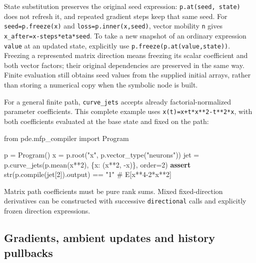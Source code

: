\documentclass[
  11pt,
]{article}
\newenvironment{Shaded}{\begin{snugshade}}{\end{snugshade}}
\newcommand{\BuiltInTok}[1]{\textcolor[rgb]{0.00,0.23,0.31}{#1}}
\newcommand{\CommentTok}[1]{\textcolor[rgb]{0.37,0.37,0.37}{#1}}
\newcommand{\ControlFlowTok}[1]{\textcolor[rgb]{0.00,0.23,0.31}{\textbf{#1}}}
\newcommand{\DecValTok}[1]{\textcolor[rgb]{0.68,0.00,0.00}{#1}}
\newcommand{\ImportTok}[1]{\textcolor[rgb]{0.00,0.46,0.62}{#1}}
\newcommand{\NormalTok}[1]{\textcolor[rgb]{0.00,0.23,0.31}{#1}}
\newcommand{\OperatorTok}[1]{\textcolor[rgb]{0.37,0.37,0.37}{#1}}
\newcommand{\StringTok}[1]{\textcolor[rgb]{0.13,0.47,0.30}{#1}}
\theoremstyle{definition}
\theoremstyle{plain}
\theoremstyle{plain}
\theoremstyle{plain}
\theoremstyle{remark}
\begin{document}
State substitution preserves the original seed expression:
\texttt{p.at(seed,\ state)} does not refresh it, and repeated gradient
steps keep that same seed. For \texttt{seed=p.freeze(x)} and
\texttt{loss=p.inner(x,seed)}, vector mobility \texttt{n} gives
\texttt{x\_after=x-steps*eta*seed}. To take a new snapshot of an
ordinary expression \texttt{value} at an updated state, explicitly use
\texttt{p.freeze(p.at(value,state))}. Freezing a represented matrix
direction means freezing its scalar coefficient and both vector factors;
their original dependencies are preserved in the same way. Finite
evaluation still obtains seed values from the supplied initial arrays,
rather than storing a numerical copy when the symbolic node is built.

For a general finite path, \texttt{curve\_jets} accepts already
factorial-normalized parameter coefficients. This complete example uses
\texttt{x(t)=x+t*x**2-t**2*x}, with both coefficients evaluated at the
base state and fixed on the path:

\begin{Shaded}
\begin{Highlighting}[]
\ImportTok{from}\NormalTok{ pde.mfp\_compiler }\ImportTok{import}\NormalTok{ Program}

\NormalTok{p }\OperatorTok{=}\NormalTok{ Program()}
\NormalTok{x }\OperatorTok{=}\NormalTok{ p.root(}\StringTok{"x"}\NormalTok{, p.vector\_type(}\StringTok{"neurons"}\NormalTok{))}
\NormalTok{jet }\OperatorTok{=}\NormalTok{ p.curve\_jets(p.mean(x}\OperatorTok{**}\DecValTok{2}\NormalTok{), \{x: (x}\OperatorTok{**}\DecValTok{2}\NormalTok{, }\OperatorTok{{-}}\NormalTok{x)\}, order}\OperatorTok{=}\DecValTok{2}\NormalTok{)}
\ControlFlowTok{assert} \BuiltInTok{str}\NormalTok{(p.}\BuiltInTok{compile}\NormalTok{(jet[}\DecValTok{2}\NormalTok{]).output) }\OperatorTok{==} \StringTok{"1"}  \CommentTok{\# E[x**4{-}2*x**2]}
\end{Highlighting}
\end{Shaded}

Matrix path coefficients must be pure rank sums. Mixed fixed-direction
derivatives can be constructed with successive \texttt{directional}
calls and explicitly frozen direction expressions.

\subsection{Gradients, ambient updates and history
pullbacks}\label{gradients-ambient-updates-and-history-pullbacks}
\end{document}
